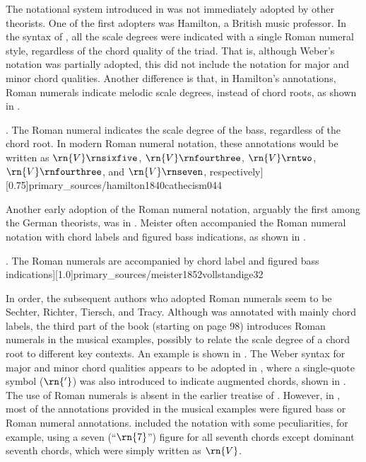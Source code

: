 
The notational system introduced in
\textcite{weber1818versuch} was not immediately adopted by
other theorists. One of the first adopters was Hamilton, a
British music professor. In the syntax of
\textcite{hamilton1840catechism}, all the scale degrees were
indicated with a single Roman numeral style, regardless of
the chord quality of the triad. That is, although Weber's
notation was partially adopted, this did not include the
notation for major and minor chord qualities. Another
difference is that, in Hamilton's annotations, Roman
numerals indicate melodic scale degrees, instead of chord
roots, as shown in
.

\phdfigure[Use of Roman numerals in \textcite[p.
44]{hamilton1840catechism}. The Roman numeral indicates the
scale degree of the bass, regardless of the chord root. In
modern Roman numeral notation, these annotations would be
written as $\rn{V}\rnsixfive$, $\rn{V}\rnfourthree$,
$\rn{V}\rntwo$, $\rn{V}\rnfourthree$, and $\rn{V}\rnseven$,
respectively][0.75]{primary_sources/hamilton1840cathecism044}

Another early adoption of the Roman numeral notation,
arguably the first among the German theorists, was in
\textcite{meister1852vollstandige}. Meister often
accompanied the Roman numeral notation with chord labels and
figured bass indications, as shown in
.

\phdfigure[Use of Roman numerals in \textcite[p.
32]{meister1852vollstandige}. The Roman numerals are
accompanied by chord label and figured bass
indications][1.0]{primary_sources/meister1852vollstandige32}

In order, the subsequent authors who adopted Roman numerals
seem to be Sechter, Richter, Tiersch, and Tracy. Although
\textcite{sechter1853grundsatze} was annotated with mainly
chord labels, the third part of the book (starting on page
98) introduces Roman numerals in the musical examples,
possibly to relate the scale degree of a chord root to
different key contexts. An example is shown in
. The Weber
syntax for major and minor chord qualities appears to be
adopted in \textcite{richter1860lehrbuch}, where a
single-quote symbol ($\rn{'}$) was also introduced to
indicate augmented chords, shown in
. The use of
Roman numerals is absent in the earlier treatise of
\textcite{tiersch1868system}. However,  in
\textcite{tiersch1874elementarbuch}, most of the annotations
provided in the musical examples were figured bass or Roman
numeral annotations. \textcite{tracy1878theory} included the
notation with some peculiarities, for example, using a seven
(``$\rn{7}$'') figure for all seventh chords except dominant
seventh chords, which were simply written as $\rn{V}$.

